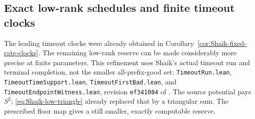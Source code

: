 \subsection{Exact low-rank schedules and finite timeout clocks}
\label{subsec:Shaik-low-schedule}
The leading timeout clocks were already obtained in
Corollary~\ref{cor:Shaik-fixed-rate-clocks}. The remaining low-rank
reserve can be made considerably more precise at finite parameters.
This refinement uses Shaik's actual timeout run and terminal completion,
not the smaller all-prefix-good set:
\texttt{TimeoutRun.lean}, \texttt{TimeoutTimeSupport.lean},
\texttt{TimeoutFirstBad.lean}, and \texttt{TimeoutEndpointWitness.lean},
revision \texttt{ef341084} of \cite{Shaik2026v324}.
The source potential pays \(S^2\); \eqref{eq:Shaik-low-triangle}
already replaced that by a triangular sum. The prescribed floor map
gives a still smaller, exactly computable reserve.

